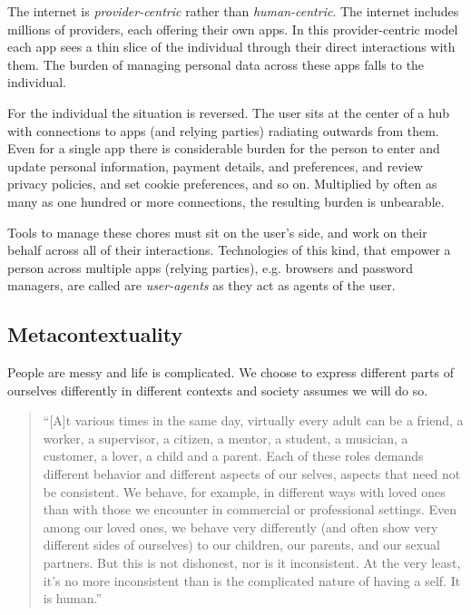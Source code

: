 \documentclass[11pt, oneside]{article}   	%
\begin{document}
The internet is \emph{provider-centric} rather than \emph{human-centric}. The internet includes millions of providers, each offering their own apps. In this provider-centric model each app sees a thin slice of the individual through their direct interactions with them. The burden of managing personal data across these apps falls to the individual. 

For the individual the situation is reversed. The user sits at the center of a hub with connections to apps (and relying parties) radiating outwards from them. Even for a single app there is considerable burden for the person to enter and update personal information, payment details, and preferences, and review privacy policies, and set cookie preferences, and so on. Multiplied by often as many as one hundred or more connections, the resulting burden is unbearable. 

Tools to manage these chores must sit on the user's side, and work on their behalf across all of their interactions. Technologies of this kind, that empower a person across multiple apps (relying parties), e.g. browsers and password managers, are called are \emph{user-agents} as they act as agents of the user. 

\subsection{Metacontextuality}

People are messy and life is complicated. We choose to express different parts of ourselves differently in different contexts and society assumes we will do so. 

\begin{quote} 
	``[A]t various times in the same day, virtually every adult can be a friend, a worker, a supervisor, a citizen, a mentor, a student, a musician, a customer, a lover, a child and a parent. Each of these roles demands different behavior and different aspects of our selves, aspects that need not be consistent. We behave, for example, in different ways with loved ones than with those we encounter in commercial or professional settings. Even among our loved ones, we behave very differently (and often show very different sides of ourselves) to our children, our parents, and our sexual partners. But this is not dishonest, nor is it inconsistent. At the very least, it's no more inconsistent than is the complicated nature of having a self. It is human.''\cite[p122]{Richards2021}
\end{quote}
\end{document}
